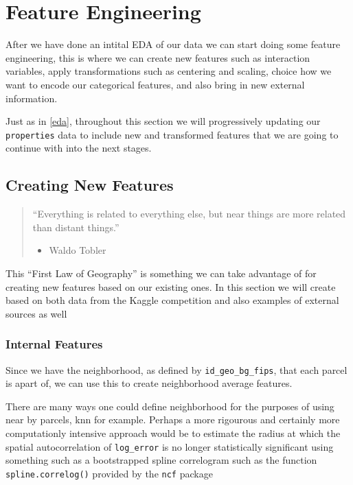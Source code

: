 \documentclass[]{book}
\providecommand{\tightlist}{%
  \setlength{\itemsep}{0pt}\setlength{\parskip}{0pt}}
\theoremstyle{definition}
\theoremstyle{definition}
\theoremstyle{definition}
\theoremstyle{remark}
\begin{document}
\chapter{Feature Engineering}\label{feat-eng}

After we have done an intital EDA of our data we can start doing some
feature engineering, this is where we can create new features such as
interaction variables, apply transformations such as centering and
scaling, choice how we want to encode our categorical features, and also
bring in new external information.

Just as in \ref{eda}, throughout this section we will progressively
updating our \texttt{properties} data to include new and transformed
features that we are going to continue with into the next stages.

\section{Creating New Features}\label{creating-new-features}

\begin{quote}
``Everything is related to everything else, but near things are more
related than distant things.''

\begin{itemize}
\tightlist
\item
  Waldo Tobler
\end{itemize}
\end{quote}

This ``First Law of Geography'' is something we can take advantage of
for creating new features based on our existing ones. In this section we
will create based on both data from the Kaggle competition and also
examples of external sources as well

\subsection{Internal Features}\label{internal-features}

Since we have the neighborhood, as defined by
\texttt{id\_geo\_bg\_fips}, that each parcel is apart of, we can use
this to create neighborhood average features.

There are many ways one could define neighborhood for the purposes of
using near by parcels, knn for example. Perhaps a more rigourous and
certainly more computationly intensive approach would be to estimate the
radius at which the spatial autocorrelation of \texttt{log\_error} is no
longer statistically significant using something such as a bootstrapped
spline correlogram such as the function \texttt{spline.correlog()}
provided by the \texttt{ncf} package
\end{document}
